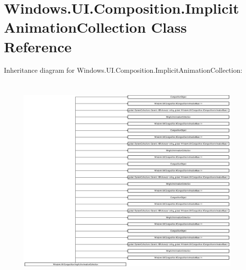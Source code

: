 \hypertarget{class_windows_1_1_u_i_1_1_composition_1_1_implicit_animation_collection}{}\section{Windows.\+U\+I.\+Composition.\+Implicit\+Animation\+Collection Class Reference}
\label{class_windows_1_1_u_i_1_1_composition_1_1_implicit_animation_collection}
Inheritance diagram for Windows.\+U\+I.\+Composition.\+Implicit\+Animation\+Collection\+:\begin{figure}[H]
\begin{center}
\leavevmode
\includegraphics[height=10.721650cm]{class_windows_1_1_u_i_1_1_composition_1_1_implicit_animation_collection}
\end{center}
\end{figure}
